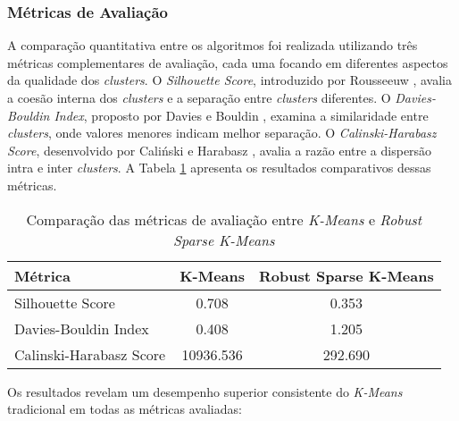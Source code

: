 \documentclass[conference]{IEEEtran}
\begin{document}
\subsubsection{Métricas de Avaliação}
A comparação quantitativa entre os algoritmos foi realizada utilizando três métricas complementares de avaliação, cada uma focando em diferentes aspectos da qualidade dos \textit{clusters}. O \textit{Silhouette Score}, introduzido por Rousseeuw \cite{rousseeuw1987silhouettes}, avalia a coesão interna dos \textit{clusters} e a separação entre \textit{clusters} diferentes. O \textit{Davies-Bouldin Index}, proposto por Davies e Bouldin \cite{davies1979cluster}, examina a similaridade entre \textit{clusters}, onde valores menores indicam melhor separação. O \textit{Calinski-Harabasz Score}, desenvolvido por Caliński e Harabasz \cite{calinski1974dendrite}, avalia a razão entre a dispersão intra e inter \textit{clusters}. A Tabela \ref{tab:clustering_metrics} apresenta os resultados comparativos dessas métricas.

\begin{table}[!htb]
    \centering
    \begin{tabular}{|l|c|c|}
        \hline
        \textbf{Métrica} & \textbf{K-Means} & \textbf{Robust Sparse K-Means} \\
        \hline
        Silhouette Score & 0.708 & 0.353 \\
        Davies-Bouldin Index & 0.408 & 1.205 \\
        Calinski-Harabasz Score & 10936.536 & 292.690 \\
        \hline
    \end{tabular}
    \caption{Comparação das métricas de avaliação entre \textit{K-Means} e \textit{Robust Sparse K-Means}}
    \label{tab:clustering_metrics}
\end{table}

Os resultados revelam um desempenho superior consistente do \textit{K-Means} tradicional em todas as métricas avaliadas:
\end{document}
